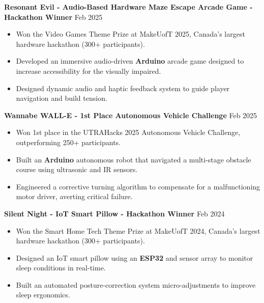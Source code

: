 \documentclass[10pt,letterpaper]{article}
\begin{document}
\textbf{Resonant Evil - Audio-Based Hardware Maze Escape Arcade Game - Hackathon Winner} \hfill Feb 2025 \\
\begin{itemize}
    \item Won the Video Games Theme Prize at MakeUofT 2025, Canada's largest hardware hackathon (300+ participants). 
    \item Developed an immersive audio-driven \textbf{Arduino} arcade game designed to increase accessibility for the visually impaired.
    \item Designed dynamic audio and haptic feedback system to guide player navigation and build tension. 
\end{itemize}



\textbf{Wannabe WALL-E - 1st Place Autonomous Vehicle Challenge} \hfill Feb 2025 \\
\begin{itemize}
    \item Won 1st place in the UTRAHacks 2025 Autonomous Vehicle Challenge, outperforming 250+ participants. 
    \item Built an \textbf{Arduino} autonomous robot that navigated a multi-stage obstacle course using ultrasonic and IR sensors.
    \item Engineered a corrective turning algorithm to compensate for a malfunctioning motor driver, averting critical failure. 
\end{itemize}




\textbf{Silent Night - IoT Smart Pillow - Hackathon Winner} \hfill Feb 2024 \\
\begin{itemize}
    \item Won the Smart Home Tech Theme Prize at MakeUofT 2024, Canada's largest hardware hackathon (300+ participants).  
    \item Designed an IoT smart pillow using an \textbf{ESP32} and sensor array to monitor sleep conditions in real-time.
    \item Built an automated posture-correction system micro-adjustments to improve sleep ergonomics. 
\end{itemize}
\end{document}
